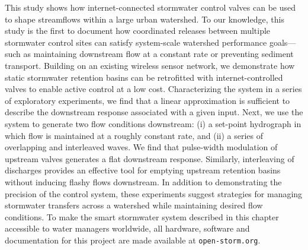 This study shows how internet-connected stormwater control valves can be used to shape streamflows within a large urban watershed. To our knowledge, this study is the first to document how coordinated releases between multiple stormwater control sites can satisfy system-scale watershed performance goals---such as maintaining downstream flow at a constant rate or preventing sediment transport. Building on an existing wireless sensor network, we demonstrate how static stormwater retention basins can be retrofitted with internet-controlled valves to enable active control at a low cost. 
Characterizing the system in a series of exploratory experiments,
we find that a linear approximation is sufficient to describe the downstream response associated with a given input. Next, we use the system to generate two flow conditions downstream: (i) a set-point hydrograph in which flow is maintained at a roughly constant rate, and (ii) a series of overlapping and interleaved waves. We find that pulse-width modulation of upstream valves generates a flat downstream response. Similarly, interleaving of discharges provides an effective tool for emptying upstream retention basins without inducing flashy flows downstream. In addition to demonstrating the precision of the control system, these experiments suggest strategies for managing stormwater transfers across a watershed while maintaining desired flow conditions. To make the smart stormwater system described in this chapter accessible to water managers worldwide, all hardware, software and documentation for this project are made available at \texttt{open-storm.org}.

